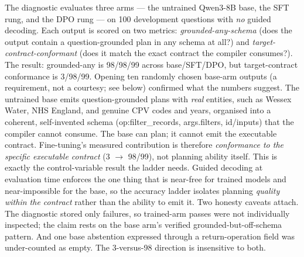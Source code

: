 \documentclass[10pt]{article} %
\begin{document}
The diagnostic evaluates three arms --- the untrained Qwen3-8B base, the SFT rung, and the DPO rung --- on 100 development questions with \emph{no} guided decoding. Each output is scored on two metrics: \emph{grounded-any-schema} (does the output contain a question-grounded plan in any schema at all?) and \emph{target-contract-conformant} (does it match the exact contract the compiler consumes?). The result: grounded-any is 98/98/99 across base/SFT/DPO, but target-contract conformance is 3/98/99. Opening ten randomly chosen base-arm outputs (a requirement, not a courtesy; see below) confirmed what the numbers suggest. The untrained base emits question-grounded plans with \emph{real} entities, such as Wessex Water, NHS England, and genuine CPV codes and years, organised into a coherent, self-invented schema (op:filter\_records, args.filters, id/inputs) that the compiler cannot consume. The base can plan; it cannot emit the executable contract. Fine-tuning's measured contribution is therefore \emph{conformance to the specific executable contract} (3 $\rightarrow$ 98/99), not planning ability itself. This is exactly the control-variable result the ladder needs. Guided decoding at evaluation time enforces the one thing that is near-free for trained models and near-impossible for the base, so the accuracy ladder isolates planning \emph{quality within the contract} rather than the ability to emit it. Two honesty caveats attach. The diagnostic stored only failures, so trained-arm passes were not individually inspected; the claim rests on the base arm's verified grounded-but-off-schema pattern. And one base abstention expressed through a return-operation field was under-counted as empty. The 3-versus-98 direction is insensitive to both.
\end{document}

